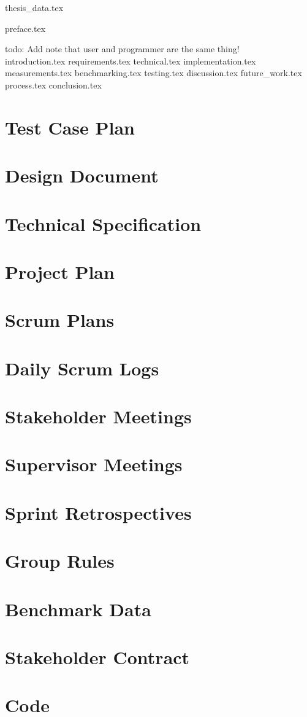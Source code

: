 \documentclass[BSP,english,oneside]{ntnuthesis/ntnubachelorthesis}
\newcommand{\todo}[1]{{\color{cyan}\lbrack todo: #1\rbrack}\\} %
\begin{document}
{thesis_data.tex}

\makefrontpages

{preface.tex}

\tableofcontents
\listoffigures
\listoftables

\todo{Add note that user and programmer are the same thing!}

{introduction.tex}
{requirements.tex}
{technical.tex}
{implementation.tex}
{measurements.tex}
{benchmarking.tex}
{testing.tex}
{discussion.tex}
{future_work.tex}
{process.tex}
{conclusion.tex}




\appendix %
\chapter{Test Case Plan}
\chapter{Design Document}
\chapter{Technical Specification}
\chapter{Project Plan}
\chapter{Scrum Plans}
\chapter{Daily Scrum Logs}
\chapter{Stakeholder Meetings}
\chapter{Supervisor Meetings}
\chapter{Sprint Retrospectives}
\chapter{Group Rules}
\chapter{Benchmark Data}
\chapter{Stakeholder Contract}
\chapter{Code}
\end{document}
